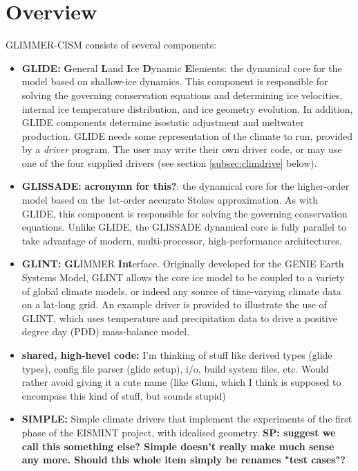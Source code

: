 \section{Overview}
%
GLIMMER-CISM consists of several components:
%
\begin{itemize}
\item {\bf GLIDE:} {\bf G}eneral {\bf L}and {\bf I}ce {\bf D}ynamic {\bf E}lements: the dynamical core for the model based on shallow-ice dynamics. This component is responsible for solving the governing conservation equations and determining ice velocities, internal ice temperature distribution, and ice geometry evolution. In addition, GLIDE components determine isostatic adjustment and meltwater production. GLIDE needs some representation of the climate to run, provided by a {\it driver} program. The user may write their own driver code, or may use one of the four supplied drivers (see section \ref{subsec:climdrive} below).
\item {\bf GLISSADE:} {\bf acronymn for this?}: the dynamical core for the higher-order model based on the 1st-order accurate Stokes approximation. As with GLIDE, this component is responsible for solving the governing conservation equations. Unlike GLIDE, the GLISSADE dynamical core is fully parallel to take advantage of modern, multi-processor, high-performance architectures.
\item {\bf GLINT:} {\bf GL}IMMER {\bf Int}erface. Originally developed for the GENIE %
Earth Systems Model, GLINT allows the core ice model to be coupled to a variety of global climate models, or indeed any source of time-varying climate data on a lat-long grid. An example driver is provided to illustrate the use of GLINT, which uses temperature and precipitation data to drive a positive degree day (PDD) mass-balance model.
\item {\bf shared, high-hevel code:} I'm thinking of stuff like derived types (glide types), config file parser (glide setup), i/o, build system files, etc. Would rather avoid giving it a cute name (like Glum, which I think is supposed to encompass this kind of stuff, but sounds stupid)
\item {\bf SIMPLE:} Simple climate drivers that implement the experiments of the first phase of the EISMINT project, with idealised geometry. \textbf{SP: suggest we call this something else? Simple doesn't really make much sense any more. Should this whole item simply be renames "test cases"?}


\end{itemize}
